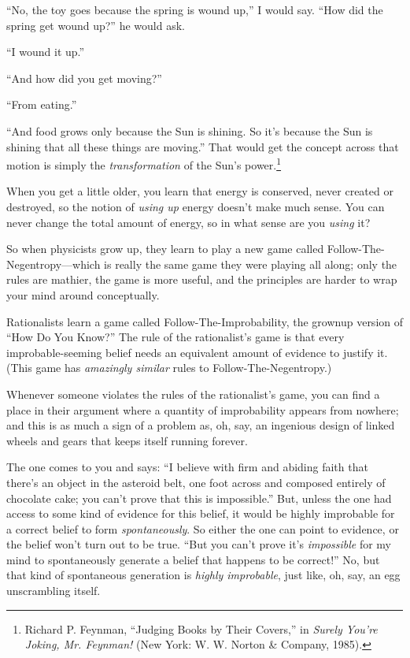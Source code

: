 {
 ``No, the toy goes because the spring is wound
up,'' I would say. ``How did the
spring get wound up?'' he would ask.}

{
 ``I wound it up.''}

{
 ``And how did you get
moving?''}

{
 ``From eating.''}

{
 ``And food grows only because the Sun is shining.
So it's because the Sun is shining that all these
things are moving.'' That would get the concept
across that motion is simply the \textit{transformation} of the
Sun's power.\footnote{Richard P. Feynman, ``Judging Books by Their
Covers,'' in \textit{Surely You're
Joking, Mr. Feynman!} (New York: W. W. Norton \& Company, 1985).}}

{
 When you get a little older, you learn that energy is conserved,
never created or destroyed, so the notion of \textit{using up} energy
doesn't make much sense. You can never change the total
amount of energy, so in what sense are you \textit{using} it?}

{
 So when physicists grow up, they learn to play a new game called
Follow-The-Negentropy---which is really the same game they were playing
all along; only the rules are mathier, the game is more useful, and the
principles are harder to wrap your mind around conceptually.}

{
 Rationalists learn a game called Follow-The-Improbability, the
grownup version of ``How Do You
Know?'' The rule of the rationalist's
game is that every improbable-seeming belief needs an equivalent amount
of evidence to justify it. (This game has \textit{amazingly similar}
rules to Follow-The-Negentropy.)}

{
 Whenever someone violates the rules of the
rationalist's game, you can find a place in their
argument where a quantity of improbability appears from nowhere; and
this is as much a sign of a problem as, oh, say, an ingenious design of
linked wheels and gears that keeps itself running forever.}

{
 The one comes to you and says: ``I believe with
firm and abiding faith that there's an object in the
asteroid belt, one foot across and composed entirely of chocolate cake;
you can't prove that this is
impossible.'' But, unless the one had access to some
kind of evidence for this belief, it would be highly improbable for a
correct belief to form \textit{spontaneously}. So either the one can
point to evidence, or the belief won't turn out to be
true. ``But you can't prove
it's \textit{impossible} for my mind to spontaneously
generate a belief that happens to be correct!'' No,
but that kind of spontaneous generation is \textit{highly improbable},
just like, oh, say, an egg unscrambling itself.}

